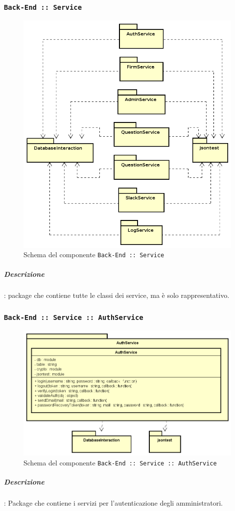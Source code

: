 \documentclass[../DefinizioneDiProdotto_v2.0.0.tex]{subfiles}
\begin{document}
\newpage
\subsubsection{\texttt{Back-End :: Service}}
\begin{figure}[!h]
	\centering
	\includegraphics[scale=0.6]{Architettura/Back-End/Service/Service.png}
	\caption{Schema del componente \texttt{Back-End :: Service}}
\end{figure}
\subparagraph{Descrizione}: package che contiene tutte le classi dei service, ma è solo rappresentativo.
\newpage
\subsubsection{\texttt{Back-End :: Service :: AuthService}}
\begin{figure}[!h]
	\centering
	\includegraphics[scale=0.6]{Architettura/Back-End/Service/AuthService.png}
	\caption{Schema del componente \texttt{Back-End :: Service :: AuthService}}
\end{figure}
\subparagraph{Descrizione}: Package che contiene i servizi per l'autenticazione degli amministratori.
\end{document}
